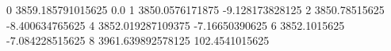0 3859.185791015625 0.0
1 3850.0576171875 -9.128173828125
2 3850.78515625 -8.400634765625
4 3852.019287109375 -7.16650390625
6 3852.1015625 -7.084228515625
8 3961.639892578125 102.4541015625
